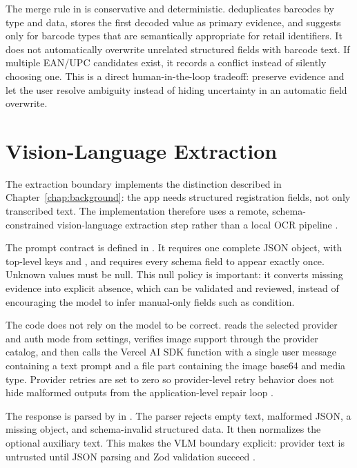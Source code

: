 The merge rule in  is conservative and deterministic.  deduplicates barcodes by type and data, stores the first decoded value as primary evidence, and suggests  only for barcode types that are semantically appropriate for retail identifiers. It does not automatically overwrite unrelated structured fields with barcode text. If multiple EAN/UPC candidates exist, it records a conflict instead of silently choosing one. This is a direct human-in-the-loop tradeoff: preserve evidence and let the user resolve ambiguity instead of hiding uncertainty in an automatic field overwrite.

\section{Vision-Language Extraction}

The extraction boundary implements the distinction described in Chapter~\ref{chap:background}: the app needs structured registration fields, not only transcribed text. The implementation therefore uses a remote, schema-constrained vision-language extraction step rather than a local OCR pipeline \cite{ai-sdk}.

The prompt contract is defined in . It requires one complete JSON object, with top-level keys  and , and requires every schema field to appear exactly once. Unknown values must be null. This null policy is important: it converts missing evidence into explicit absence, which can be validated and reviewed, instead of encouraging the model to infer manual-only fields such as condition.

The code does not rely on the model to be correct.  reads the selected provider and auth mode from settings, verifies image support through the provider catalog, and then calls the Vercel AI SDK  function with a single user message containing a text prompt and a file part containing the image base64 and media type. Provider retries are set to zero so provider-level retry behavior does not hide malformed outputs from the application-level repair loop \cite{ai-sdk}.

The response is parsed by  in . The parser rejects empty text, malformed JSON, a missing  object, and schema-invalid structured data. It then normalizes the optional auxiliary text. This makes the VLM boundary explicit: provider text is untrusted until JSON parsing and Zod validation succeed \cite{zod}.

